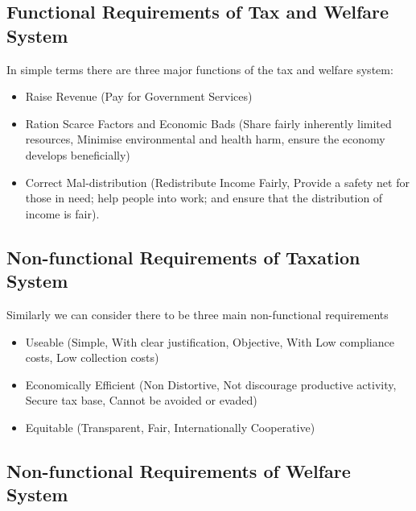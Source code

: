 \documentclass[]{tufte-handout}
\providecommand{\tightlist}{%
  \setlength{\itemsep}{0pt}\setlength{\parskip}{0pt}}
\begin{document}
\hypertarget{functional-requirements-of-tax-and-welfare-system}{%
\subsection{Functional Requirements of Tax and Welfare
System}\label{functional-requirements-of-tax-and-welfare-system}}

In simple terms there are three major functions of the tax and welfare
system:

\begin{itemize}
\tightlist
\item
  Raise Revenue (Pay for Government Services)
\item
  Ration Scarce Factors and Economic Bads (Share fairly inherently
  limited resources, Minimise environmental and health harm, ensure the
  economy develops beneficially)
\item
  Correct Mal-distribution (Redistribute Income Fairly, Provide a safety
  net for those in need; help people into work; and ensure that the
  distribution of income is fair).
\end{itemize}

\hypertarget{non-functional-requirements-of-taxation-system}{%
\subsection{Non-functional Requirements of Taxation
System}\label{non-functional-requirements-of-taxation-system}}

Similarly we can consider there to be three main non-functional
requirements

\begin{itemize}
\item
  Useable (Simple, With clear justification, Objective, With Low
  compliance costs, Low collection costs)
\item
  Economically Efficient (Non Distortive, Not discourage productive
  activity, Secure tax base, Cannot be avoided or evaded)
\item
  Equitable (Transparent, Fair, Internationally Cooperative)
\end{itemize}

\hypertarget{non-functional-requirements-of-welfare-system}{%
\subsection{Non-functional Requirements of Welfare
System}\label{non-functional-requirements-of-welfare-system}}
\end{document}
